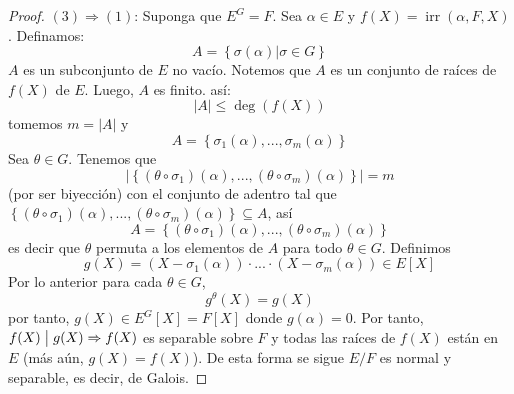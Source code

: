 \documentclass[12pt]{report}
\theoremstyle{largebreak}
\newcommand\divides{\ensuremath{\bigm|}}
\DeclareMathOperator{\irr}{irr}
\begin{document}
\begin{proof}
        $(3)\Rightarrow(1)$: Suponga que $E^G=F$. Sea $\alpha\in E$ y $f(X)=\irr(\alpha,F,X)$. Definamos:
        \begin{equation*}
            A=\left\{\sigma(\alpha)\Big|\sigma\in G \right\}
        \end{equation*}
        $A$ es un subconjunto de $E$ no vacío. Notemos que $A$ es un conjunto de raíces de $f(X)$ de $E$. Luego, $A$ es finito. así:
        \begin{equation*}
            |A|\leq\deg(f(X))
        \end{equation*}
        tomemos $m=|A|$ y
        \begin{equation*}
            A=\left\{\sigma_1(\alpha),...,\sigma_m(\alpha) \right\}
        \end{equation*}
        Sea $\theta\in G$. Tenemos que
        \begin{equation*}
            |\left\{(\theta\circ\sigma_1)(\alpha),...,(\theta\circ\sigma_m)(\alpha) \right\}|=m
        \end{equation*}
        (por ser biyección) con el conjunto de adentro tal que $\left\{(\theta\circ\sigma_1)(\alpha),...,(\theta\circ\sigma_m)(\alpha)\right\}\subseteq A$, así
        \begin{equation*}
            A=\left\{(\theta\circ\sigma_1)(\alpha),...,(\theta\circ\sigma_m)(\alpha)\right\}
        \end{equation*}
        es decir que $\theta$ permuta a los elementos de $A$ para todo $\theta\in G$. Definimos
        \begin{equation*}
            g(X)=(X-\sigma_1(\alpha))\cdot...\cdot(X-\sigma_m(\alpha))\in E[X]
        \end{equation*}
        Por lo anterior para cada $\theta\in G$,
        \begin{equation*}
            g^\theta(X)=g(X)
        \end{equation*}
        por tanto, $g(X)\in E^{G}[X]=F[X]$ donde $g(\alpha)=0$. Por tanto, $f(X)\divides g(X)\Rightarrow f(X)$ es separable sobre $F$ y todas las raíces de $f(X)$ están en $E$ (más aún, $g(X)=f(X)$). De esta forma se sigue $E/F$ es normal y separable, es decir, de Galois.
    \end{proof}
\end{document}
